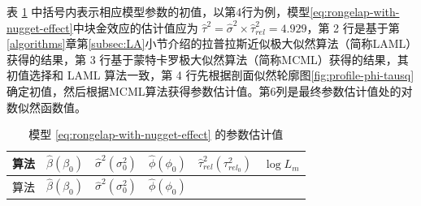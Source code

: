 \documentclass[12pt,a4paper,UTF8,twoside]{book}
\theoremstyle{definition}
\theoremstyle{definition}
\theoremstyle{definition}
\theoremstyle{remark}
\begin{document}
表 \ref{tab:rongelap-mcml-result} 中括号内表示相应模型参数的初值，以第4行为例，模型\eqref{eq:rongelap-with-nugget-effect}中块金效应的估计值应为 \(\hat{\tau}^2 = \hat{\sigma}^{2} \times \hat{\tau}^2_{rel} = 4.929\)，第 2 行是基于第\ref{algorithms}章第\ref{subsec:LA}小节介绍的拉普拉斯近似极大似然算法（简称LAML）获得的结果，第 3 行基于蒙特卡罗极大似然算法（简称MCML）获得的结果，其初值选择和 LAML 算法一致，第 4 行先根据剖面似然轮廓图\ref{fig:profile-phi-tausq}确定初值，然后根据MCML算法获得参数估计值。第6列是最终参数估计值处的对数似然函数值。

\begin{longtable}[]{@{}clllll@{}}
\caption{\label{tab:rongelap-mcml-result} 模型 \eqref{eq:rongelap-with-nugget-effect} 的参数估计值}\tabularnewline
\toprule
\begin{minipage}[b]{0.09\columnwidth}\centering
算法\strut
\end{minipage} & \begin{minipage}[b]{0.15\columnwidth}\raggedright
\(\hat{\beta}(\beta_{0})\)\strut
\end{minipage} & \begin{minipage}[b]{0.15\columnwidth}\raggedright
\(\hat{\sigma}^{2}(\sigma^2_0)\)\strut
\end{minipage} & \begin{minipage}[b]{0.15\columnwidth}\raggedright
\(\hat{\phi}(\phi_0)\)\strut
\end{minipage} & \begin{minipage}[b]{0.15\columnwidth}\raggedright
\(\hat{\tau}^2_{rel}(\tau^2_{rel_0})\)\strut
\end{minipage} & \begin{minipage}[b]{0.15\columnwidth}\raggedright
\(\log L_{m}\)\strut
\end{minipage}\tabularnewline
\midrule
\endfirsthead
\toprule
\begin{minipage}[b]{0.09\columnwidth}\centering
算法\strut
\end{minipage} & \begin{minipage}[b]{0.15\columnwidth}\raggedright
\(\hat{\beta}(\beta_{0})\)\strut
\end{minipage} & \begin{minipage}[b]{0.15\columnwidth}\raggedright
\(\hat{\sigma}^{2}(\sigma^2_0)\)\strut
\end{minipage} & \begin{minipage}[b]{0.15\columnwidth}\raggedright
\(\hat{\phi}(\phi_0)\)\strut
\end{minipage} & \begin{minipage}[b]{0.15\columnwidth}\raggedright

\end{minipage}
\end{longtable}
\end{document}
